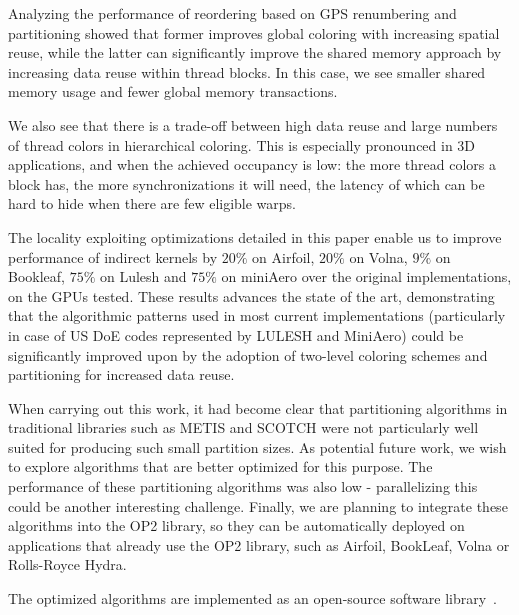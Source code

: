 \documentclass[number]{elsarticle}
\begin{document}
Analyzing the performance of reordering based on GPS renumbering and 
partitioning showed that former improves global coloring with increasing 
spatial reuse, while the latter can significantly improve the shared memory 
approach by increasing data reuse within thread blocks. In this case, we 
see smaller shared memory usage and fewer global memory transactions.

We also see that there is a trade-off between high data reuse and large numbers 
of thread colors in hierarchical coloring. This is especially pronounced in 3D 
applications, and when the achieved occupancy is low: the more thread colors a 
block has, the more synchronizations it will need, the latency of which can be 
hard to hide when there are few eligible warps.

The locality exploiting optimizations detailed in this paper enable us to 
improve performance of indirect kernels by $20\%$ on Airfoil, $20\%$ on 
Volna, $9\%$ on Bookleaf, $75\%$ on Lulesh and $75\%$ on miniAero over the 
original implementations, on the GPUs tested. These results advances the state 
of the art, demonstrating that the algorithmic patterns used in most current 
implementations (particularly in case of US DoE codes represented by 
LULESH and MiniAero) could be significantly improved upon by the adoption of 
two-level coloring schemes and partitioning for increased data reuse.

When carrying out this work, it had become clear that partitioning algorithms in
traditional libraries such as METIS and SCOTCH were not particularly well 
suited for producing such small partition sizes. As potential future work, we 
wish to explore algorithms that are better optimized for this purpose. The 
performance of these partitioning algorithms was also low - parallelizing this 
could be another interesting challenge. Finally, we are planning to integrate 
these algorithms into the OP2 library, so they can be automatically deployed on 
applications that already use the OP2 library, such as Airfoil, BookLeaf, Volna 
or Rolls-Royce Hydra.

The optimized algorithms are implemented as an open-source software 
library~\cite{opt-library}. 
\end{document}
